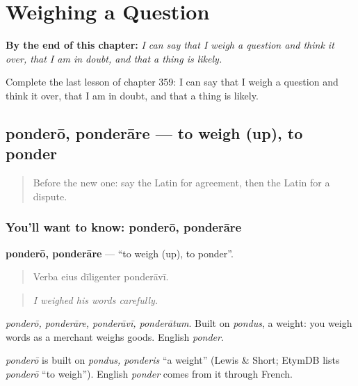 
\chapter{Weighing a Question}
\label{ch:la-weighing-a-question}

\begin{chapteropening}
\textbf{By the end of this chapter:} \emph{I can say that I weigh a question and think it over, that I am in doubt, and that a thing is likely.}

Complete the last lesson of chapter 359: I can say that I weigh a question and think it over, that I am in doubt, and that a thing is likely.
\end{chapteropening}

\section[ponderō, ponderāre]{ponderō, ponderāre — to weigh (up), to ponder}

\label{lesson:LA-C359-pondero}



\begin{quote}
Before the new one: say the Latin for agreement, then the Latin for a dispute.
\end{quote}

\subsection*{You'll want to know: ponderō, ponderāre}
\textbf{ponderō, ponderāre} — \textquotedblleft{}to weigh (up), to ponder\textquotedblright{}.

\begin{quote}
Verba eius dīligenter ponderāvī.
\end{quote}

\begin{quote}
\emph{I weighed his words carefully.}
\end{quote}

\emph{ponderō, ponderāre, ponderāvī, ponderātum}. Built on \emph{pondus}, a weight: you weigh words as a merchant weighs goods. English \emph{ponder}.

\begin{cousinweb}
\emph{ponderō} is built on \emph{pondus, ponderis} \textquotedblleft{}a weight\textquotedblright{} (Lewis \& Short; EtymDB lists \emph{ponderō} \textquotedblleft{}to weigh\textquotedblright{}). English \emph{ponder} comes from it through French.
\end{cousinweb}

